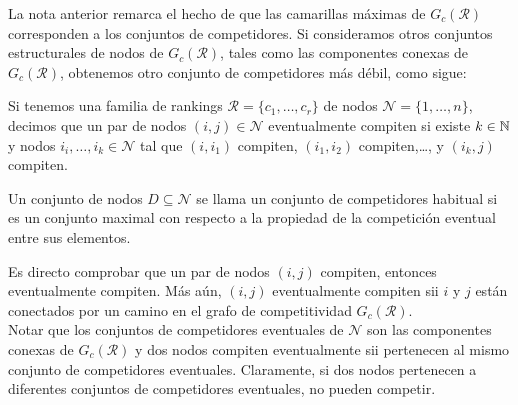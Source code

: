 La nota anterior remarca el hecho de que las camarillas máximas de $G_c(\mathcal{R})$ corresponden a los conjuntos de competidores. Si consideramos otros conjuntos estructurales de nodos de $G_c(\mathcal{R})$, tales como las componentes conexas de $G_c(\mathcal{R})$, obtenemos otro conjunto de competidores más débil, como sigue:

\begin{defi}
Si tenemos una familia de rankings $\mathcal{R} = \{c_1,\dots,c_r\}$ de nodos $\mathcal{N} = \{1,\dots,n\}$, decimos que un par de nodos $(i,j) \in \mathcal{N}$ eventualmente compiten si existe $k \in \mathbb{N}$ y nodos $i_i,\dots,i_k \in \mathcal{N}$ tal que $(i,i_1)$ compiten, $(i_1,i_2)$ compiten,\dots, y $(i_k,j)$ compiten. 
\end{defi}

\begin{defi}
Un conjunto de nodos $D \subseteq \mathcal{N}$ se llama un conjunto de competidores habitual si es un conjunto maximal con respecto a la propiedad de la competición eventual entre sus elementos.
\end{defi}


\begin{nota}
Es directo comprobar que un par de nodos $(i,j)$ compiten, entonces eventualmente compiten. Más aún, $(i,j)$ eventualmente compiten sii $i$ y $j$ están conectados por un camino en el grafo de competitividad $G_c(\mathcal{R})$.\\

Notar que los conjuntos de competidores eventuales de $\mathcal{N}$ son las componentes conexas de $G_c(\mathcal{R})$ y dos nodos compiten eventualmente sii pertenecen al mismo conjunto de competidores eventuales. Claramente, si dos nodos pertenecen a diferentes conjuntos de competidores eventuales, no pueden competir. 
\end{nota}

\begin{lema}

\end{lema}



